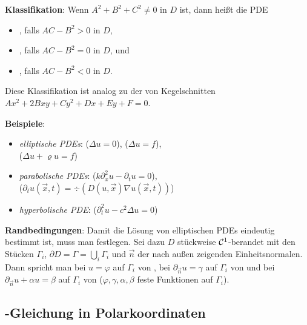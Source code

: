 \textbf{Klassifikation}:
Wenn $A^2 + B^2 + C^2 \not= 0$ in $D$ ist, dann heißt die PDE
\begin{itemize}
    \item
    , falls $AC - B^2 > 0$ in $D$,

    \item
    , falls $AC - B^2 = 0$ in $D$, und

    \item
    , falls $AC - B^2 < 0$ in $D$.
\end{itemize}
Diese Klassifikation ist analog zu der von Kegelschnitten $Ax^2 + 2Bxy + Cy^2 + Dx + Ey + F = 0$.

\textbf{Beispiele}:
\begin{itemize}
    \item
    \emph{elliptische PDEs}:
    ($\Delta u = 0$),
    ($\Delta u = f$),\\
    ($\Delta u + \varrho u = f$)

    \item
    \emph{parabolische PDEs}:
    ($k \partial_x^2 u - \partial_t u = 0$),\\
    ($\partial_t u(\vec{x}, t) = \div(D(u, \vec{x}) \nabla u(\vec{x}, t))$)

    \item
    \emph{hyperbolische PDE}:
    ($\partial_t^2 u - c^2 \Delta u = 0$)
\end{itemize}

\linie

\textbf{Randbedingungen}:
Damit die Lösung von elliptischen PDEs eindeutig bestimmt ist, muss man
 festlegen.
Sei dazu $D$ stückweise $\mathcal{C}^1$-berandet mit den Stücken $\Gamma_i$,
$\partial D = \Gamma = \bigcup_i \Gamma_i$ und $\vec{n}$ der nach außen zeigenden
Einheitsnormalen.
Dann spricht man bei $u = \varphi$ auf $\Gamma_i$ von ,
bei $\partial_{\vec{n}} u = \gamma$ auf $\Gamma_i$ von  und
bei $\partial_{\vec{n}} u + \alpha u = \beta$ auf $\Gamma_i$ von 
($\varphi, \gamma, \alpha, \beta$ feste Funktionen auf $\Gamma_i$).

\pagebreak

\subsection{%
    -Gleichung in Polarkoordinaten%
}

